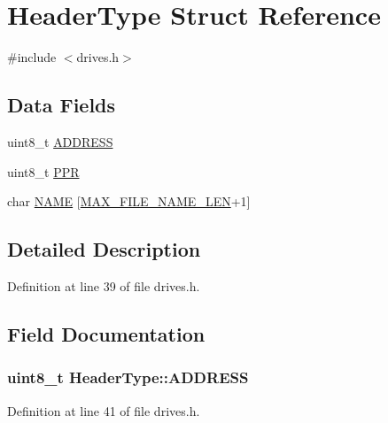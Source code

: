 \hypertarget{structHeaderType}{}\section{Header\+Type Struct Reference}
\label{structHeaderType}


{\ttfamily \#include $<$drives.\+h$>$}

\subsection*{Data Fields}
\begin{DoxyCompactItemize}
\item 
uint8\+\_\+t \hyperlink{structHeaderType_a70edfd477c537b2fa51c1aa63fcc7bee}{A\+D\+D\+R\+E\+SS}
\item 
uint8\+\_\+t \hyperlink{structHeaderType_ac642cdad0f3874495afa0ab687a56fd0}{P\+PR}
\item 
char \hyperlink{structHeaderType_aac997fd2dc536b10072137ecaf1fd0b4}{N\+A\+ME} \mbox{[}\hyperlink{drives_8h_a835262f9c26026aab5f91a528f57ad8f}{M\+A\+X\+\_\+\+F\+I\+L\+E\+\_\+\+N\+A\+M\+E\+\_\+\+L\+EN}+1\mbox{]}
\end{DoxyCompactItemize}


\subsection{Detailed Description}


Definition at line 39 of file drives.\+h.



\subsection{Field Documentation}
\subsubsection[{\texorpdfstring{A\+D\+D\+R\+E\+SS}{ADDRESS}}]{\setlength{\rightskip}{0pt plus 5cm}uint8\+\_\+t Header\+Type\+::\+A\+D\+D\+R\+E\+SS}\hypertarget{structHeaderType_a70edfd477c537b2fa51c1aa63fcc7bee}{}\label{structHeaderType_a70edfd477c537b2fa51c1aa63fcc7bee}


Definition at line 41 of file drives.\+h.



